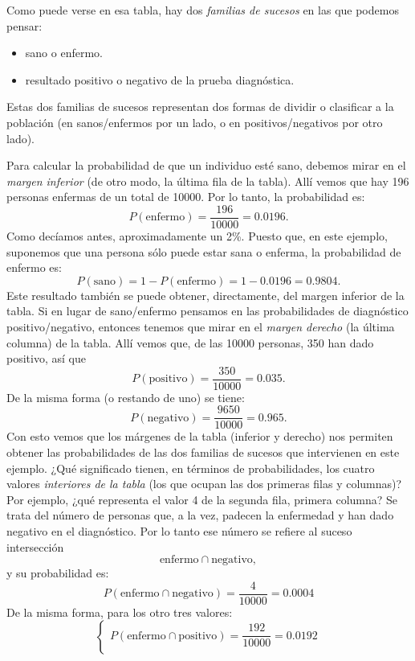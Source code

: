 \begin{ejemplo}
        Como puede verse en esa tabla, hay dos {\em familias de sucesos} en las que podemos pensar:
        \begin{itemize}
           \item sano o enfermo.
           \item resultado positivo o negativo de la prueba diagnóstica.
         \end{itemize}
        Estas dos familias de sucesos representan dos formas de dividir o clasificar a la población (en sanos/enfermos por un lado, o en positivos/negativos por otro lado).

        Para calcular la probabilidad de que un individuo esté sano, debemos mirar en el {\em margen inferior} (de otro modo, la última fila de la tabla). Allí vemos que hay 196 personas enfermas de un total de 10000. Por lo tanto, la probabilidad es:
        \[P(\mbox{enfermo})=\dfrac{196}{10000}=0.0196.\]
        Como decíamos antes, aproximadamente un 2\%. Puesto que, en este ejemplo, suponemos que una persona sólo puede estar sana o enferma, la probabilidad de enfermo es:
        \[P(\mbox{sano})=1-P(\mbox{enfermo})=1-0.0196=0.9804.\]
        Este resultado también se puede obtener, directamente, del margen inferior de la tabla. Si en lugar de sano/enfermo pensamos en las probabilidades de diagnóstico positivo/negativo, entonces tenemos que mirar en el {\em margen derecho} (la última columna) de la tabla. Allí vemos que, de las 10000 personas, 350 han dado positivo, así que
        \[P(\mbox{positivo})=\dfrac{350}{10000}=0.035.\]
        De la misma forma (o restando de uno) se tiene:
        \[P(\mbox{negativo})=\dfrac{9650}{10000}=0.965.\]
        Con esto vemos que los márgenes de la tabla (inferior y derecho) nos permiten obtener las probabilidades de las dos familias de sucesos que intervienen en este ejemplo. ¿Qué significado tienen, en términos de probabilidades, los cuatro valores {\em interiores de la tabla} (los que ocupan las dos primeras filas y columnas)? Por ejemplo, ¿qué representa el valor 4 de la segunda fila, primera columna? Se trata del número de personas que, a la vez, padecen la enfermedad y han dado negativo en el diagnóstico. Por lo tanto ese número se refiere al suceso intersección
        \[\mbox{enfermo}\cap\mbox{negativo},\]
        y su probabilidad es:
        \[P\left(\mbox{enfermo}\cap\mbox{negativo}\right)=\dfrac{4}{10000}=0.0004\]
        De la misma forma, para los otro tres valores:
        \[
        \begin{cases}
        P\left(\mbox{enfermo}\cap\mbox{positivo}\right)=\dfrac{192}{10000}=0.0192\\[5mm]

\end{cases}\]
\end{ejemplo}
